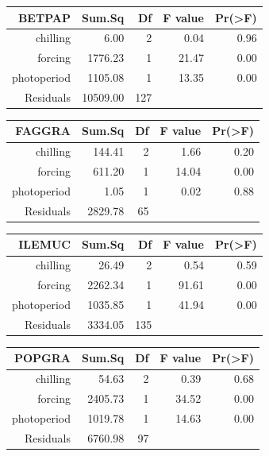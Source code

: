 \documentclass{article}\usepackage[]{graphicx}\usepackage[]{color}
\begin{document}
\begin{table}[ht]
\centering
\begin{tabular}{rrrrr}
  \hline
  BETPAP & Sum.Sq & Df & F value & Pr(>F) \\
 \hline
chilling & 6.00 &   2 & 0.04 & 0.96 \\ 
  forcing & 1776.23 &   1 & 21.47 & 0.00 \\ 
  photoperiod & 1105.08 &   1 & 13.35 & 0.00 \\ 
  Residuals & 10509.00 & 127 &  &  \\ 
   \hline
\end{tabular}
\end{table}
\begin{table}[ht]
\centering
\begin{tabular}{rrrrr}
  \hline
  FAGGRA & Sum.Sq & Df & F value & Pr(>F) \\
 \hline
chilling & 144.41 &   2 & 1.66 & 0.20 \\ 
  forcing & 611.20 &   1 & 14.04 & 0.00 \\ 
  photoperiod & 1.05 &   1 & 0.02 & 0.88 \\ 
  Residuals & 2829.78 &  65 &  &  \\ 
   \hline
\end{tabular}
\end{table}
\begin{table}[ht]
\centering
\begin{tabular}{rrrrr}
  \hline
  ILEMUC & Sum.Sq & Df & F value & Pr(>F) \\
 \hline
chilling & 26.49 &   2 & 0.54 & 0.59 \\ 
  forcing & 2262.34 &   1 & 91.61 & 0.00 \\ 
  photoperiod & 1035.85 &   1 & 41.94 & 0.00 \\ 
  Residuals & 3334.05 & 135 &  &  \\ 
   \hline
\end{tabular}
\end{table}
\begin{table}[ht]
\centering
\begin{tabular}{rrrrr}
  \hline
  POPGRA & Sum.Sq & Df & F value & Pr(>F) \\
 \hline
chilling & 54.63 &   2 & 0.39 & 0.68 \\ 
  forcing & 2405.73 &   1 & 34.52 & 0.00 \\ 
  photoperiod & 1019.78 &   1 & 14.63 & 0.00 \\ 
  Residuals & 6760.98 &  97 &  &  \\ 
   \hline
\end{tabular}
\end{table}
\end{document}
